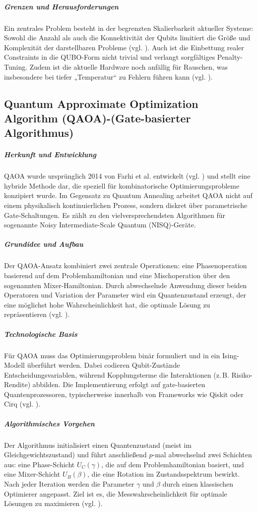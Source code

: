 \subparagraph{Grenzen und Herausforderungen}
Ein zentrales Problem besteht in der begrenzten Skalierbarkeit aktueller Systeme: Sowohl die Anzahl als auch die Konnektivität der Qubits limitiert die Größe und Komplexität der darstellbaren Probleme (vgl. \cite{sakuler_real-world_2025}). Auch ist die Einbettung realer Constraints in die QUBO-Form nicht trivial und verlangt sorgfältiges Penalty-Tuning. Zudem ist die aktuelle Hardware noch anfällig für Rauschen, was insbesondere bei tiefer „Temperatur“ zu Fehlern führen kann (vgl. \cite{rosenberg_finding_2016, sakuler_real-world_2025}).

\subsection{Quantum Approximate Optimization Algorithm (QAOA)-(Gate-basierter Algorithmus)}

\subparagraph{Herkunft und Entwicklung}
QAOA wurde ursprünglich 2014 von Farhi et al. entwickelt (vgl. \cite{farhi_quantum_2014}) und stellt eine hybride Methode dar, die speziell für kombinatorische Optimierungsprobleme konzipiert wurde. Im Gegensatz zu Quantum Annealing arbeitet QAOA nicht auf einem physikalisch kontinuierlichen Prozess, sondern diskret über parametrische Gate-Schaltungen. Es zählt zu den vielversprechendsten Algorithmen für sogenannte Noisy Intermediate-Scale Quantum (NISQ)-Geräte.

\subparagraph{Grundidee und Aufbau}
Der QAOA-Ansatz kombiniert zwei zentrale Operationen: eine Phasenoperation basierend auf dem Problemhamiltonian und eine Mischoperation über den sogenannten Mixer-Hamiltonian. Durch abwechselnde Anwendung dieser beiden Operatoren und Variation der Parameter wird ein Quantenzustand erzeugt, der eine möglichst hohe Wahrscheinlichkeit hat, die optimale Lösung zu repräsentieren (vgl. \cite{brandhofer_benchmarking_2022}).

\subparagraph{Technologische Basis}
Für QAOA muss das Optimierungsproblem binär formuliert und in ein Ising-Modell überführt werden. Dabei codieren Qubit-Zustände Entscheidungsvariablen, während Kopplungsterme die Interaktionen (z.\,B. Risiko-Rendite) abbilden. Die Implementierung erfolgt auf gate-basierten Quantenprozessoren, typischerweise innerhalb von Frameworks wie Qiskit oder Cirq (vgl. \cite{buonaiuto_best_2023}).

\subparagraph{Algorithmisches Vorgehen}
Der Algorithmus initialisiert einen Quantenzustand (meist im Gleichgewichtszustand) und führt anschließend $p$-mal abwechselnd zwei Schichten aus: eine Phase-Schicht $U_C(\gamma)$, die auf dem Problemhamiltonian basiert, und eine Mixer-Schicht $U_B(\beta)$, die eine Rotation im Zustandsspektrum bewirkt. Nach jeder Iteration werden die Parameter $\gamma$ und $\beta$ durch einen klassischen Optimierer angepasst. Ziel ist es, die Messwahrscheinlichkeit für optimale Lösungen zu maximieren (vgl. \cite{brandhofer_benchmarking_2022}).


